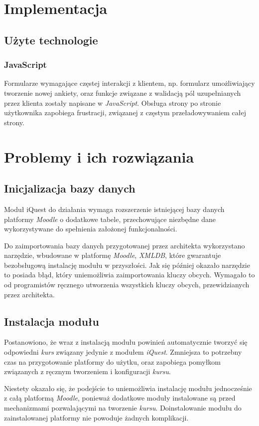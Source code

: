 \documentclass[12pt]{article}
\begin{document}
\section{Implementacja}
\subsection{Użyte technologie}
\subsubsection{JavaScript}
Formularze wymagające częstej interakcji z klientem, np. formularz umożliwiający tworzenie nowej ankiety, oraz funkcje związane z walidacją pól uzupełnianych przez klienta zostały napisane w \emph{JavaScript}. Obsługa strony po stronie użytkownika zapobiega frustracji, związanej z częstym przeładowywaniem całej strony.

\section{Problemy i ich rozwiązania}
\subsection{Inicjalizacja bazy danych}
Moduł iQuest do działania wymaga rozszerzenie istniejącej bazy danych platformy \emph{Moodle} o dodatkowe tabele, przechowujące niezbędne dane wykorzystywane do spełnienia założonej funkcjonalności.

Do zaimportowania bazy danych przygotowanej przez architekta wykorzystano narzędzie, wbudowane w platformę \emph{Moodle}, \emph{XMLDB}, które gwarantuje bezobsługową instalację modułu w przyszłości. Jak się później okazało narzędzie to posiada błąd, który uniemożliwia zaimportowania kluczy obcych. Wymagało to od programistów ręcznego utworzenia wszystkich kluczy obcych, przewidzianych przez architekta.

\subsection{Instalacja modułu}
Postanowiono, że wraz z instalacją modułu powinień automatycznie tworzyć się odpowiedni \emph{kurs} związany jedynie z modułem \emph{iQuest}. Zmniejsza to potrzebny czas na przygotowanie platformy do użytku, oraz zapobiega pomyłkom związanych z ręcznym tworzeniem i konfiguracji \emph{kursu}. 

Niestety okazało się, że podejście to uniemożliwia instalację modułu jednocześnie z całą platformą \emph{Moodle}, ponieważ dodatkowe moduły instalowane są przed mechanizmami pozwalającymi na tworzenie \emph{kursu}. Doinstalowanie modułu do zainstalowanej platformy nie powoduje żadnych komplikacji.
\end{document}
